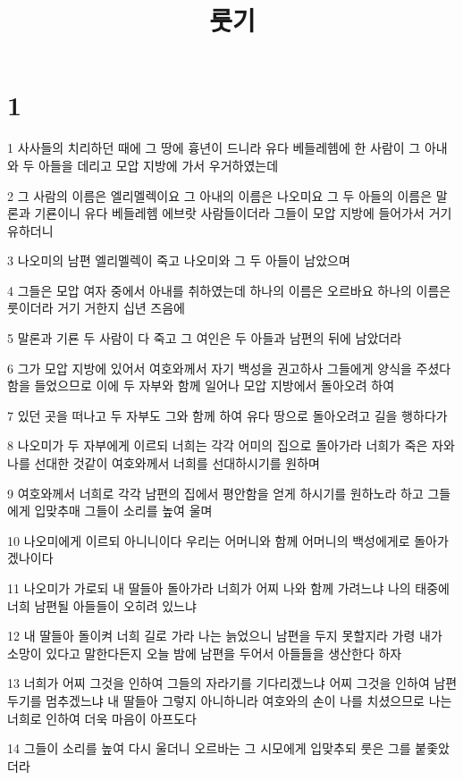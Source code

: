 

\title{룻기}


\chapter{1}

\par 1 사사들의 치리하던 때에 그 땅에 흉년이 드니라 유다 베들레헴에 한 사람이 그 아내와 두 아들을 데리고 모압 지방에 가서 우거하였는데
\par 2 그 사람의 이름은 엘리멜렉이요 그 아내의 이름은 나오미요 그 두 아들의 이름은 말론과 기룐이니 유다 베들레헴 에브랏 사람들이더라 그들이 모압 지방에 들어가서 거기 유하더니
\par 3 나오미의 남편 엘리멜렉이 죽고 나오미와 그 두 아들이 남았으며
\par 4 그들은 모압 여자 중에서 아내를 취하였는데 하나의 이름은 오르바요 하나의 이름은 룻이더라 거기 거한지 십년 즈음에
\par 5 말론과 기룐 두 사람이 다 죽고 그 여인은 두 아들과 남편의 뒤에 남았더라
\par 6 그가 모압 지방에 있어서 여호와께서 자기 백성을 권고하사 그들에게 양식을 주셨다 함을 들었으므로 이에 두 자부와 함께 일어나 모압 지방에서 돌아오려 하여
\par 7 있던 곳을 떠나고 두 자부도 그와 함께 하여 유다 땅으로 돌아오려고 길을 행하다가
\par 8 나오미가 두 자부에게 이르되 너희는 각각 어미의 집으로 돌아가라 너희가 죽은 자와 나를 선대한 것같이 여호와께서 너희를 선대하시기를 원하며
\par 9 여호와께서 너희로 각각 남편의 집에서 평안함을 얻게 하시기를 원하노라 하고 그들에게 입맞추매 그들이 소리를 높여 울며
\par 10 나오미에게 이르되 아니니이다 우리는 어머니와 함께 어머니의 백성에게로 돌아가겠나이다
\par 11 나오미가 가로되 내 딸들아 돌아가라 너희가 어찌 나와 함께 가려느냐 나의 태중에 너희 남편될 아들들이 오히려 있느냐
\par 12 내 딸들아 돌이켜 너희 길로 가라 나는 늙었으니 남편을 두지 못할지라 가령 내가 소망이 있다고 말한다든지 오늘 밤에 남편을 두어서 아들들을 생산한다 하자
\par 13 너희가 어찌 그것을 인하여 그들의 자라기를 기다리겠느냐 어찌 그것을 인하여 남편 두기를 멈추겠느냐 내 딸들아 그렇지 아니하니라 여호와의 손이 나를 치셨으므로 나는 너희로 인하여 더욱 마음이 아프도다
\par 14 그들이 소리를 높여 다시 울더니 오르바는 그 시모에게 입맞추되 룻은 그를 붙좇았더라
